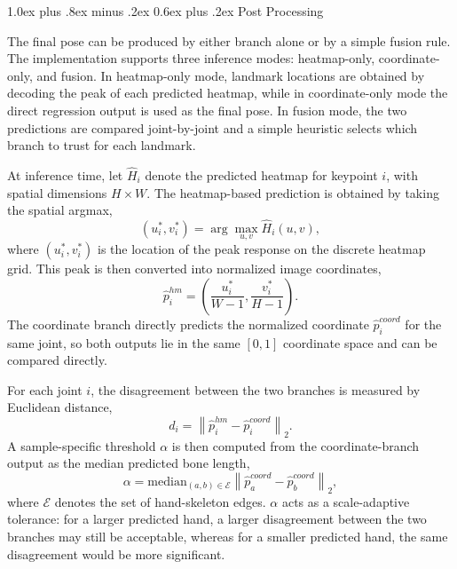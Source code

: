 ﻿\documentclass[10pt,letterpaper]{article}
\makeatletter
\renewcommand\subsection{\@startsection{subsection}{2}{\z@}%
  {1.0ex plus .8ex minus .2ex}%
  {0.6ex plus .2ex}%
  {\normalfont\itshape}}
\makeatother
\begin{document}
\subsection{Post Processing}

\noindent
The final pose can be produced by either branch alone or by a simple fusion rule. The implementation supports three inference modes: heatmap-only, coordinate-only, and fusion. In heatmap-only mode, landmark locations are obtained by decoding the peak of each predicted heatmap, while in coordinate-only mode the direct regression output is used as the final pose. In fusion mode, the two predictions are compared joint-by-joint and a simple heuristic selects which branch to trust for each landmark.

At inference time, let \(\hat{H}_i\) denote the predicted heatmap for keypoint \(i\), with spatial dimensions \(H \times W\). The heatmap-based prediction is obtained by taking the spatial argmax,
\begin{equation}
(u_i^*, v_i^*) = \arg\max_{u,v} \hat{H}_i(u,v),
\label{eq:heatmap-argmax}
\end{equation}
where \((u_i^*, v_i^*)\) is the location of the peak response on the discrete heatmap grid. This peak is then converted into normalized image coordinates,
\begin{equation}
\hat{p}^{hm}_i =
\left(
\frac{u_i^*}{W-1},
\frac{v_i^*}{H-1}
\right).
\label{eq:heatmap-decode}
\end{equation}
The coordinate branch directly predicts the normalized coordinate \(\hat{p}^{coord}_i\) for the same joint, so both outputs lie in the same \([0,1]\) coordinate space and can be compared directly.

For each joint \(i\), the disagreement between the two branches is measured by Euclidean distance,
\begin{equation}
d_i = \left\| \hat{p}^{hm}_i - \hat{p}^{coord}_i \right\|_2.
\label{eq:fusion-disagreement}
\end{equation}
A sample-specific threshold \(\alpha\) is then computed from the coordinate-branch output as the median predicted bone length,
\begin{equation}
\alpha = \mathrm{median}_{(a,b)\in \mathcal{E}}
\left\| \hat{p}^{coord}_a - \hat{p}^{coord}_b \right\|_2,
\label{eq:fusion-threshold}
\end{equation}
where \(\mathcal{E}\) denotes the set of hand-skeleton edges. \(\alpha\) acts as a scale-adaptive tolerance: for a larger predicted hand, a larger disagreement between the two branches may still be acceptable, whereas for a smaller predicted hand, the same disagreement would be more significant.
\end{document}
